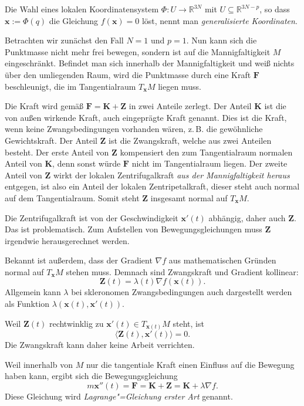\documentclass[a4paper,10pt,fleqn,twocolumn,twoside,dvipdfmx]{scrartcl}
\numberwithin{equation}{section}
\newcommand{\bvec}[1]{\mathbf{#1}}
\newcommand{\R}{\mathbb R}
\begin{document}
Die Wahl eines lokalen Koordinatensystem $\Phi\colon U\to\R^{3N}$ mit
$U\subseteq\R^{3N-p}$, so dass $\bvec x := \Phi(q)$ die Gleichung
$f(\bvec x)=0$ löst, nennt man \emph{generalisierte Koordinaten}.

Betrachten wir zunächst den Fall $N=1$ und $p=1$. Nun kann sich die
Punktmasse nicht mehr frei bewegen, sondern ist auf die
Mannigfaltigkeit $M$ eingeschränkt. Befindet man sich innerhalb
der Mannigfaltigkeit und weiß nichts über den umliegenden Raum,
wird die Punktmasse durch eine Kraft $\bvec F$ beschleunigt,
die im Tangentialraum $T_{\bvec x} M$ liegen muss.

Die Kraft wird gemäß $\bvec F = \bvec K+\bvec Z$ in zwei
Anteile zerlegt. Der Anteil $\bvec K$ ist die von außen wirkende
Kraft, auch eingeprägte Kraft genannt. Dies ist die Kraft, wenn keine
Zwangsbedingungen vorhanden wären, z.\,B. die gewöhnliche
Gewichtskraft. Der Anteil $\bvec Z$
ist die Zwangskraft, welche aus zwei Anteilen besteht. Der erste
Anteil von $\bvec Z$ kompensiert den zum Tangentialraum normalen
Anteil von $\bvec K$, denn sonst würde $\bvec F$ nicht im
Tangentialraum liegen. Der zweite Anteil von $\bvec Z$ wirkt
der lokalen Zentrifugalkraft \emph{aus der Mannigfaltigkeit heraus}
entgegen, ist also ein Anteil der lokalen Zentripetalkraft, dieser
steht auch normal auf dem Tangentialraum. Somit steht $\bvec Z$
insgesamt normal auf $T_{\bvec x} M$.

Die Zentrifugalkraft ist von der Geschwindigkeit $\bvec x'(t)$
abhängig, daher auch $\bvec Z$. Das ist problematisch.
Zum Aufstellen von Bewegungsgleichungen muss $\bvec Z$ irgendwie
herausgerechnet werden.

Bekannt ist außerdem, dass der Gradient $\nabla f$ aus
mathematischen Gründen normal auf $T_{\bvec x} M$ stehen muss.
Demnach sind Zwangskraft und Gradient kollinear:%
\begin{equation}
\bvec Z(t) = \lambda(t)\nabla f(\bvec x(t)).
\end{equation}
Allgemein kann $\lambda$ bei skleronomen Zwangsbedingungen
auch dargestellt werden als Funktion
$\lambda(\bvec x(t),\bvec x'(t))$.

Weil $\bvec Z(t)$ rechtwinklig zu $\bvec x'(t)\in T_{\bvec x(t)} M$
steht, ist
\begin{equation}
\langle\bvec Z(t),\bvec x'(t)\rangle = 0.
\end{equation}
Die Zwangskraft kann daher keine Arbeit verrichten.

Weil innerhalb von $M$ nur die tangentiale Kraft einen Einfluss auf
die Bewegung haben kann, ergibt sich die Bewegungsgleichung
\begin{equation}
m\bvec x''(t) = \bvec F = \bvec K+\bvec Z = \bvec K+\lambda\nabla f.
\end{equation}
Diese Gleichung wird \emph{Lagrange"=Gleichung erster Art} genannt.
\end{document}

